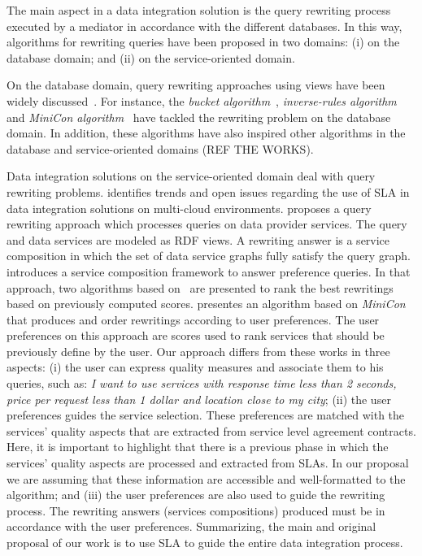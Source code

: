 The main aspect in a data integration solution is 
the query rewriting process executed by a mediator
in accordance with the different databases.
%
In this way, algorithms for rewriting queries have
been proposed in two domains: (i) on the database 
domain; and (ii) on the service-oriented domain.

On the database domain, query rewriting approaches using
views have been widely discussed~\cite{Halevy:2001}.
%
For instance, the \textit{bucket algorithm}~\cite{Levy:1996}, 
\textit{inverse-rules algorithm}~\cite{Duschka:1997} and 
\textit{MiniCon algorithm}~\cite{Pottinger:2001} have
tackled the rewriting problem on the database domain.
%
In addition, these algorithms have also inspired other
algorithms in the database and service-oriented domains (REF THE WORKS).

Data integration solutions on the 
service-oriented domain deal with query rewriting problems. \cite{Carvalho2015} identifies
trends and open issues regarding the use of SLA in data integration solutions on
multi-cloud environments.
%
\cite{Barhamgi2010} proposes a query rewriting approach 
which processes queries on data provider services.
The query and data services are modeled as RDF views.
A rewriting answer is a service composition in which 
the set of data service graphs fully satisfy the query graph.  
%
\cite{Benouaret2011} introduces a service composition
framework to answer preference queries. In that approach, two algorithms based
on~\cite{Barhamgi2010} are presented to rank the best rewritings based on previously computed scores.
%
\cite{ba2014} presentes an algorithm based on \textit{MiniCon} 
that produces and order rewritings according to user preferences. 
The user preferences on this approach are scores used to rank 
services that should be previously define by the user. 
%
Our approach differs from these works in three aspects:
(i) the user can express quality measures and associate them
to his queries, such as: \textit{I want to use services with response
time less than 2 seconds, price per request less than 1 dollar
and location close to my city}; 
(ii) the user preferences guides the service selection. 
These preferences are matched with the services' quality aspects
that are extracted from service level agreement contracts.
Here, it is important to highlight that there
is a previous phase in which the services' quality aspects are 
processed and extracted from SLAs. 
In our proposal we are assuming that these information are accessible and
well-formatted to the algorithm; and
(iii) the user preferences are also used to guide the rewriting process.
The rewriting answers (services compositions) produced must be in 
accordance with the user preferences.
%
Summarizing, the main and original proposal of our work is to use SLA to guide
the entire data integration process.
     
